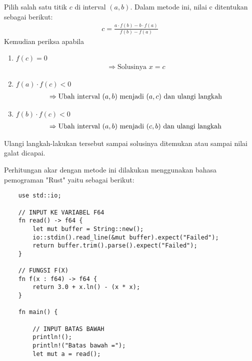 \documentclass[12pt]{article}
\begin{document}
\begin{enumerate}
{\begin{enumerate}
{                Pilih salah satu titik $ c $ di interval $ (a,b) $. Dalam metode ini, nilai c ditentukan sebagai berikut:
                \begin{align*}
                    c = \frac{a \cdot f(b) - b \cdot f(a)}{f(b) - f(a)} 
                \end{align*}
                Kemudian periksa apabila
                \begin{enumerate}
                    \item {
                        $ f(c) = 0 $
                        \begin{align*}
                            \Rightarrow\text{Solusinya } x = c
                        \end{align*}
                    }
                    \item {
                        $ f(a) \cdot f(c) < 0 $
                        \begin{align*}
                            \Rightarrow\text{Ubah interval $ (a,b) $ menjadi $ (a,c) $ dan ulangi langkah}
                        \end{align*}
                    }
                    \item {
                        $ f(b) \cdot f(c) < 0 $
                        \begin{align*}
                            \Rightarrow\text{Ubah interval $ (a,b) $ menjadi $ (c,b) $ dan ulangi langkah}
                        \end{align*}
                    }
                \end{enumerate}
            }
        \end{enumerate}
        Ulangi langkah-lakukan tersebut sampai solusinya ditemukan atau sampai nilai galat dicapai.

        Perhitungan akar dengan metode ini dilakukan menggunakan bahasa pemograman "Rust" yaitu sebagai berikut:
        \begin{lstlisting}
    use std::io;

    // INPUT KE VARIABEL F64
    fn read() -> f64 {
        let mut buffer = String::new();
        io::stdin().read_line(&mut buffer).expect("Failed");
        return buffer.trim().parse().expect("Failed");
    }

    // FUNGSI F(X)
    fn f(x : f64) -> f64 {
        return 3.0 + x.ln() - (x * x);
    }

    fn main() {

        // INPUT BATAS BAWAH 
        println!();
        println!("Batas bawah =");
        let mut a = read();


\end{lstlisting}}
\end{enumerate}
\end{document}
